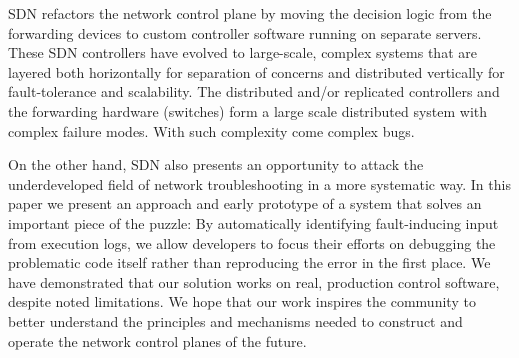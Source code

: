 

SDN refactors the network control plane by moving the decision logic from the
forwarding devices to custom controller software running on separate servers.
These SDN controllers have evolved to large-scale, complex systems that are
layered both horizontally for separation of concerns and distributed vertically
for fault-tolerance and scalability. The distributed and/or replicated
controllers and the forwarding hardware (switches) form a large scale
distributed system with complex failure modes. With such complexity come complex
bugs.

On the other hand, SDN also presents an opportunity to attack the underdeveloped
field of network troubleshooting in a more systematic way. In this paper we
present an approach and early prototype of a system that solves an important
piece of the puzzle: By automatically identifying fault-inducing input from
execution logs, we allow developers to focus their efforts on
debugging the problematic code itself rather than reproducing the error in the
first place. We have demonstrated that our solution works on real, production
control software, despite noted limitations. We hope that our work inspires the
community to better understand the principles and mechanisms needed to construct
and operate the network control planes of the future.

